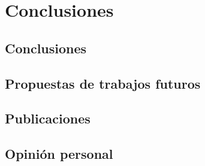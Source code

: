 \chapter{Conclusiones}
\label{chap:conclusiones}

\section{Conclusiones}



\section{Propuestas de trabajos futuros}
\section{Publicaciones}
\section{Opinión personal}
